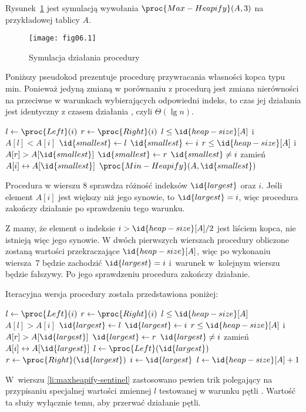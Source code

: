 
\exercise %
Rysunek~\ref{fig:6.2-1} jest symulacją wywołania $\proc{Max-Heapify}(A,3)$ na przykładowej tablicy $A$.
\begin{figure}[!h]
	\begin{center}
		\texttt{[image: fig06.1]}
	\end{center}
	\caption{Symulacja działania procedury } \label{fig:6.2-1}
\end{figure}

\exercise %
Poniższy pseudokod prezentuje procedurę przywracania własności kopca typu min. Ponieważ jedyną zmianą w porównaniu z procedurą  jest zmiana nierówności na przeciwne w warunkach wybierających odpowiedni indeks, to czas jej działania jest identyczny z czasem działania , czyli $\Theta(\lg n)$.
\begin{codebox}
\li	$l\gets\proc{Left}(i)$
\li	$r\gets\proc{Right}(i)$
\li	\If $l\le\id{heap-size}[A]$ i~$A[l]<A[i]$
\li		\Then $\id{smallest}\gets l$
\li		\Else $\id{smallest}\gets i$
		\End
\li	\If $r\le\id{heap-size}[A]$ i $A[r]>A[\id{smallest}]$
\li		\Then $\id{smallest}\gets r$
		\End
\li	\If $\id{smallest}\ne i$
\li		\Then
			zamień $A[i]\leftrightarrow A[\id{smallest}]$
\li			$\proc{Min-Heapify}(A,\id{smallest})$
		\End
\end{codebox}

\exercise %
Procedura w wierszu 8 sprawdza różność indeksów $\id{largest}$ oraz $i$. Jeśli element $A[i]$ jest większy niż jego synowie, to $\id{largest}=i$, więc procedura zakończy działanie po sprawdzeniu tego warunku.

\exercise %
Z  mamy, że element o indeksie $i>\id{heap-size}[A]/2$ jest liściem kopca, nie istnieją więc jego synowie. W dwóch pierwszych wierszach procedury  obliczone zostaną wartości przekraczające $\id{heap-size}[A]$, więc po wykonaniu wiersza~7 będzie zachodzić $\id{largest}=i$ i~warunek w~kolejnym wierszu będzie fałszywy. Po jego sprawdzeniu procedura zakończy działanie.

\exercise %
Iteracyjna wersja procedury  została przedstawiona poniżej:
\begin{codebox}
\li	$l\gets\proc{Left}(i)$
\li	$r\gets\proc{Right}(i)$
\li	\While $l\le\id{heap-size}[A]$
\li		\Do
			\If $A[l]>A[i]$
\li				\Then $\id{largest}\gets l$
\li				\Else $\id{largest}\gets i$
				\End
\li			\If $r\le\id{heap-size}[A]$ i $A[r]>A[\id{largest}]$
\li				\Then $\id{largest}\gets r$
				\End
\li			\If $\id{largest}\ne i$
\li				\Then
					zamień $A[i]\leftrightarrow A[\id{largest}]$
\li					$l\gets\proc{Left}(\id{largest})$
\li					$r\gets\proc{Right}(\id{largest})$
\li					$i\gets\id{largest}$
\li				\Else $l\gets\id{heap-size}[A]+1$ \label{li:maxheapify-sentinel}
				\End
		\End
\end{codebox}
W~wierszu \ref{li:maxheapify-sentinel} zastosowano pewien trik polegający na przypisaniu specjalnej wartości zmiennej $l$ testowanej w warunku pętli . Wartość ta służy wyłącznie temu, aby przerwać działanie pętli.

